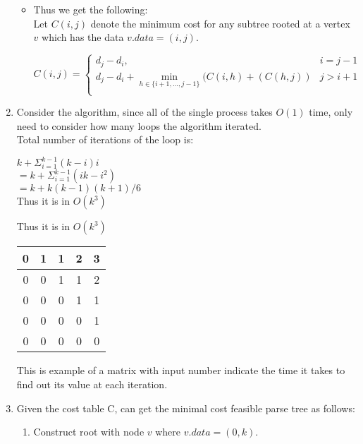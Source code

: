 \documentclass[10pt]{article}
\begin{document}
\begin{enumerate}[label=(\alph*)]
\begin{algorithm}
\begin{itemize}
        \item Thus we get the following:\\
          Let $C(i,j)$ denote the minimum cost for any subtree rooted at a
          vertex $v$ which has the data $v.data = (i, j)$.

          \[C(i,j) = \begin{cases}
            d_j- d_i, & i = j-1\\
            d_j- d_i + \min_{h\in \{i+1,...,j-1\}}(C(i,h)+(C(h,j)) & j> i+1\\
          \end{cases}\]
      \end{itemize}
    \end{algorithm}
    \item Consider the algorithm, since all of the single process takes $O(1)$
      time, only need to consider how many loops the algorithm iterated.\\ 
      Total number of iterations of the loop is:\\
      \begin{center}
        $k + \Sigma_{i=1}^{k-1}(k-i)i$\\
        $= k +\Sigma_{i=1}^{k-1}(ik-i^2)$\\
        $= k + k(k-1)(k+1)/6$\\
        Thus it is in $O(k^3)$
      \end{center}
      Thus it is in $O(k^3)$
 	  	\begin{center}
		  	\begin{tabular}{ |c|c|c|c|c| }
          \hline
 			  	0 & 1 & 1 & 2 & 3 \\
          \hline
   				0 & 0 & 1 & 1 & 2 \\  
          \hline
 	  			0 & 0 & 0 & 1 & 1 \\
          \hline
          0 & 0 & 0 & 0 & 1 \\
          \hline
          0 & 0 & 0 & 0 & 0 \\
          \hline
		  	\end{tabular}
  		\end{center}
      This is example of a matrix with input number indicate the time it takes
      to find out its value at each iteration. 
  \item Given the cost table C, can get the minimal cost feasible parse tree as
    follows: 
    \begin{enumerate}[label=(\arabic*)]
    	\item Construct root with node $v$ where $v.data = (0,k)$.

\end{enumerate}
\end{enumerate}
\end{document}
